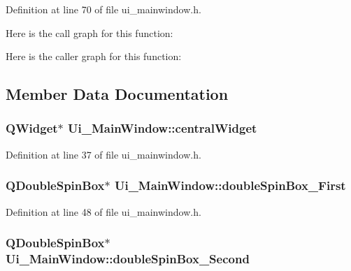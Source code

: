 Definition at line 70 of file ui\+\_\+mainwindow.\+h.



Here is the call graph for this function\+:




Here is the caller graph for this function\+:




\subsection{Member Data Documentation}
\hypertarget{class_ui___main_window_a30075506c2116c3ed4ff25e07ae75f81}{}
\subsubsection[{central\+Widget}]{\setlength{\rightskip}{0pt plus 5cm}Q\+Widget$\ast$ Ui\+\_\+\+Main\+Window\+::central\+Widget}\label{class_ui___main_window_a30075506c2116c3ed4ff25e07ae75f81}


Definition at line 37 of file ui\+\_\+mainwindow.\+h.

\hypertarget{class_ui___main_window_a56527845326b0a2ba6129adfc79b7777}{}
\subsubsection[{double\+Spin\+Box\+\_\+\+First}]{\setlength{\rightskip}{0pt plus 5cm}Q\+Double\+Spin\+Box$\ast$ Ui\+\_\+\+Main\+Window\+::double\+Spin\+Box\+\_\+\+First}\label{class_ui___main_window_a56527845326b0a2ba6129adfc79b7777}


Definition at line 48 of file ui\+\_\+mainwindow.\+h.

\hypertarget{class_ui___main_window_a17271f1a8cd9c3ca3b6d6ce10a280e2b}{}
\subsubsection[{double\+Spin\+Box\+\_\+\+Second}]{\setlength{\rightskip}{0pt plus 5cm}Q\+Double\+Spin\+Box$\ast$ Ui\+\_\+\+Main\+Window\+::double\+Spin\+Box\+\_\+\+Second}\label{class_ui___main_window_a17271f1a8cd9c3ca3b6d6ce10a280e2b}


